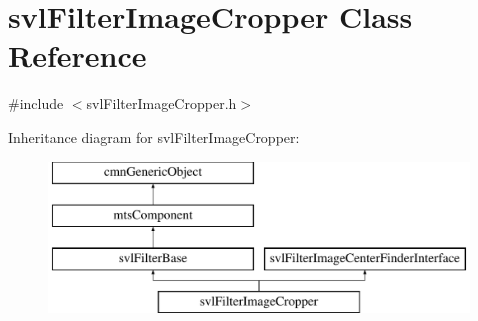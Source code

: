 \hypertarget{classsvl_filter_image_cropper}{\section{svl\-Filter\-Image\-Cropper Class Reference}
\label{classsvl_filter_image_cropper}
}


{\ttfamily \#include $<$svl\-Filter\-Image\-Cropper.\-h$>$}

Inheritance diagram for svl\-Filter\-Image\-Cropper\-:\begin{figure}[H]
\begin{center}
\leavevmode
\includegraphics[height=4.000000cm]{d8/dca/classsvl_filter_image_cropper}
\end{center}
\end{figure}
